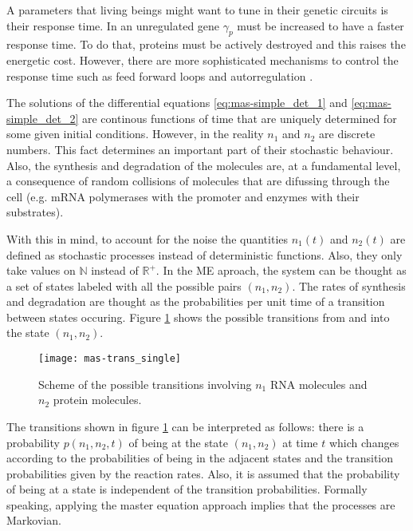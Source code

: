A parameters that living beings might want to tune in their genetic circuits is their response time. In an unregulated gene $\gamma_p$ must be increased to have a faster response time. To do that, proteins must be actively destroyed and this raises the energetic cost. However, there are more sophisticated mechanisms to control the response time such as feed forward loops and autorregulation \cite{alon06}.

The solutions of the differential equations \eqref{eq:mas-simple_det_1} and \eqref{eq:mas-simple_det_2} are continous functions of time that are uniquely determined for some given initial conditions. However, in the reality $n_1$ and $n_2$ are discrete numbers. This fact determines an important part of their stochastic behaviour. Also, the synthesis and degradation of the molecules are, at a fundamental level, a consequence of random collisions of molecules that are difussing through the cell (e.g. mRNA polymerases with the promoter and enzymes with their substrates).

With this in mind, to account for the noise the quantities $n_1(t)$ and $n_2(t)$ are defined as stochastic processes instead of deterministic functions. Also, they only take values on $\mathbb{N}$ instead of $\mathbb{R}^+$. In the ME aproach, the system can be thought as a set of states labeled with all the possible pairs $(n_1,n_2)$. The rates of synthesis and degradation are thought as the probabilities per unit time of a transition between states occuring. Figure \ref{fig:mas-trans_single} shows the possible transitions from and into the state $(n_1,n_2)$.

\begin{figure}[H]
  \centering
  \texttt{[image: mas-trans\_single]}
  \caption[Transitions between states for a single gene]{\label{fig:mas-trans_single} Scheme of the possible transitions involving $n_1$ RNA molecules and $n_2$ protein molecules.}
\end{figure}

The transitions shown in figure \ref{fig:mas-trans_single} can be interpreted as follows: there is a probability $p(n_1,n_2,t)$ of being at the state $(n_1,n_2)$ at time $t$ which changes according to the probabilities of being in the adjacent states and the transition probabilities given by the reaction rates. Also, it is assumed that the probability of being at a state is independent of the transition probabilities. Formally speaking, applying the master equation approach implies that the processes are Markovian.

